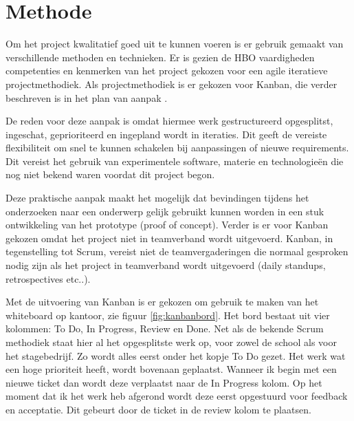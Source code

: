 \chapter{Methode}
Om het project kwalitatief goed uit te kunnen voeren is er gebruik gemaakt van verschillende methoden en technieken. Er is gezien de HBO vaardigheden competenties en kenmerken van het project gekozen voor een agile iteratieve projectmethodiek. Als projectmethodiek is er gekozen voor Kanban, die verder beschreven is in het plan van aanpak \cite{pva}.\par
De reden voor deze aanpak is omdat hiermee werk gestructureerd opgesplitst, ingeschat, geprioriteerd en ingepland wordt in iteraties. Dit geeft de vereiste flexibiliteit om snel te kunnen schakelen bij aanpassingen of nieuwe requirements. Dit vereist het gebruik van experimentele software, materie en technologieën die nog niet bekend waren voordat dit project begon.\par
Deze praktische aanpak maakt het mogelijk dat bevindingen tijdens het onderzoeken naar een onderwerp gelijk gebruikt kunnen worden in een stuk ontwikkeling van het prototype (proof of concept). Verder is er voor Kanban gekozen omdat het project niet in teamverband wordt uitgevoerd. Kanban, in tegenstelling tot Scrum, vereist niet de teamvergaderingen die normaal gesproken nodig zijn als het project in teamverband wordt uitgevoerd (daily standups, retrospectives etc..).\par
Met de uitvoering van Kanban is er gekozen om gebruik te maken van het whiteboard op kantoor, zie figuur \ref{fig:kanbanbord}. Het bord bestaat uit vier kolommen: To Do, In Progress, Review en Done. Net als de bekende Scrum methodiek staat hier al het opgesplitste werk op, voor zowel de school als voor het stagebedrijf. Zo wordt alles eerst onder het kopje To Do gezet. Het werk wat een hoge prioriteit heeft, wordt bovenaan geplaatst. Wanneer ik begin met een nieuwe ticket dan wordt deze verplaatst naar de In Progress kolom. Op het moment dat ik het werk heb afgerond wordt deze eerst opgestuurd voor feedback en acceptatie. Dit gebeurt door de ticket in de review kolom te plaatsen.\par
\newpage

